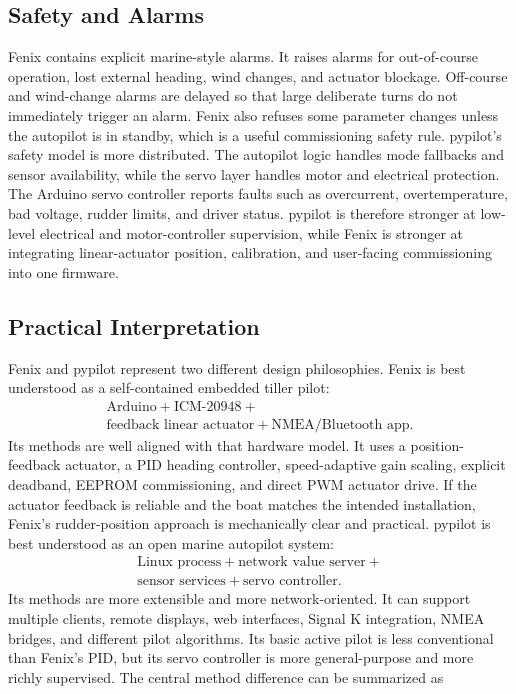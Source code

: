 \documentclass[10pt,twocolumn]{article}
\begin{document}
\subsection{Safety and Alarms}
Fenix contains explicit marine-style alarms.  It raises alarms for
out-of-course operation, lost external heading, wind changes, and actuator
blockage.  Off-course and wind-change alarms are delayed so that large
deliberate turns do not immediately trigger an alarm.  Fenix also refuses
some parameter changes unless the autopilot is in standby, which is a
useful commissioning safety rule.
pypilot's safety model is more distributed.  The autopilot logic handles
mode fallbacks and sensor availability, while the servo layer handles
motor and electrical protection.  The Arduino servo controller reports
faults such as overcurrent, overtemperature, bad voltage, rudder limits,
and driver status.  pypilot is therefore stronger at low-level electrical
and motor-controller supervision, while Fenix is stronger at integrating
linear-actuator position, calibration, and user-facing commissioning into
one firmware.
\subsection{Practical Interpretation}
Fenix and pypilot represent two different design philosophies.
Fenix is best understood as a self-contained embedded tiller pilot:
{\small
\[
\begin{gathered}
\text{Arduino}+\text{ICM-20948}+{}\\
\text{feedback linear actuator}+\text{NMEA/Bluetooth app}.
\end{gathered}
\]
}
Its methods are well aligned with that hardware model.  It uses a
position-feedback actuator, a PID heading controller, speed-adaptive gain
scaling, explicit deadband, EEPROM commissioning, and direct PWM actuator
drive.  If the actuator feedback is reliable and the boat matches the
intended installation, Fenix's rudder-position approach is mechanically
clear and practical.
pypilot is best understood as an open marine autopilot system:
{\small
\[
\begin{gathered}
\text{Linux process}+\text{network value server}+{}\\
\text{sensor services}+\text{servo controller}.
\end{gathered}
\]
}
Its methods are more extensible and more network-oriented.  It can support
multiple clients, remote displays, web interfaces, Signal K integration,
NMEA bridges, and different pilot algorithms.  Its basic active pilot is
less conventional than Fenix's PID, but its servo controller is more
general-purpose and more richly supervised.
The central method difference can be summarized as
\end{document}
